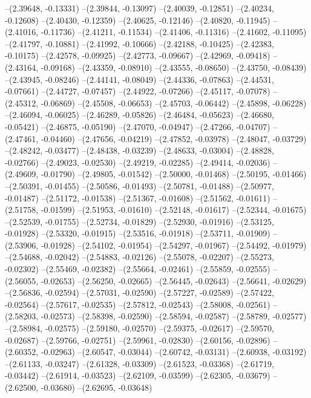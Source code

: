 --(2.39648, -0.13331)
--(2.39844, -0.13097)
--(2.40039, -0.12851)
--(2.40234, -0.12608)
--(2.40430, -0.12359)
--(2.40625, -0.12146)
--(2.40820, -0.11945)
--(2.41016, -0.11736)
--(2.41211, -0.11534)
--(2.41406, -0.11316)
--(2.41602, -0.11095)
--(2.41797, -0.10881)
--(2.41992, -0.10666)
--(2.42188, -0.10425)
--(2.42383, -0.10175)
--(2.42578, -0.09925)
--(2.42773, -0.09667)
--(2.42969, -0.09418)
--(2.43164, -0.09168)
--(2.43359, -0.08910)
--(2.43555, -0.08650)
--(2.43750, -0.08439)
--(2.43945, -0.08246)
--(2.44141, -0.08049)
--(2.44336, -0.07863)
--(2.44531, -0.07661)
--(2.44727, -0.07457)
--(2.44922, -0.07266)
--(2.45117, -0.07078)
--(2.45312, -0.06869)
--(2.45508, -0.06653)
--(2.45703, -0.06442)
--(2.45898, -0.06228)
--(2.46094, -0.06025)
--(2.46289, -0.05826)
--(2.46484, -0.05623)
--(2.46680, -0.05421)
--(2.46875, -0.05190)
--(2.47070, -0.04947)
--(2.47266, -0.04707)
--(2.47461, -0.04460)
--(2.47656, -0.04219)
--(2.47852, -0.03978)
--(2.48047, -0.03729)
--(2.48242, -0.03477)
--(2.48438, -0.03239)
--(2.48633, -0.03004)
--(2.48828, -0.02766)
--(2.49023, -0.02530)
--(2.49219, -0.02285)
--(2.49414, -0.02036)
--(2.49609, -0.01790)
--(2.49805, -0.01542)
--(2.50000, -0.01468)
--(2.50195, -0.01466)
--(2.50391, -0.01455)
--(2.50586, -0.01493)
--(2.50781, -0.01488)
--(2.50977, -0.01487)
--(2.51172, -0.01538)
--(2.51367, -0.01608)
--(2.51562, -0.01611)
--(2.51758, -0.01599)
--(2.51953, -0.01610)
--(2.52148, -0.01617)
--(2.52344, -0.01675)
--(2.52539, -0.01755)
--(2.52734, -0.01829)
--(2.52930, -0.01916)
--(2.53125, -0.01928)
--(2.53320, -0.01915)
--(2.53516, -0.01918)
--(2.53711, -0.01909)
--(2.53906, -0.01928)
--(2.54102, -0.01954)
--(2.54297, -0.01967)
--(2.54492, -0.01979)
--(2.54688, -0.02042)
--(2.54883, -0.02126)
--(2.55078, -0.02207)
--(2.55273, -0.02302)
--(2.55469, -0.02382)
--(2.55664, -0.02461)
--(2.55859, -0.02555)
--(2.56055, -0.02653)
--(2.56250, -0.02665)
--(2.56445, -0.02643)
--(2.56641, -0.02629)
--(2.56836, -0.02594)
--(2.57031, -0.02590)
--(2.57227, -0.02589)
--(2.57422, -0.02564)
--(2.57617, -0.02535)
--(2.57812, -0.02543)
--(2.58008, -0.02561)
--(2.58203, -0.02573)
--(2.58398, -0.02590)
--(2.58594, -0.02587)
--(2.58789, -0.02577)
--(2.58984, -0.02575)
--(2.59180, -0.02570)
--(2.59375, -0.02617)
--(2.59570, -0.02687)
--(2.59766, -0.02751)
--(2.59961, -0.02830)
--(2.60156, -0.02896)
--(2.60352, -0.02963)
--(2.60547, -0.03044)
--(2.60742, -0.03131)
--(2.60938, -0.03192)
--(2.61133, -0.03247)
--(2.61328, -0.03309)
--(2.61523, -0.03368)
--(2.61719, -0.03442)
--(2.61914, -0.03523)
--(2.62109, -0.03599)
--(2.62305, -0.03679)
--(2.62500, -0.03680)
--(2.62695, -0.03648)
